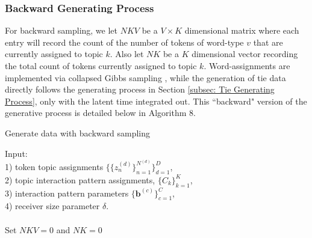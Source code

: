 \documentclass[a4paper]{article}
\begin{document}
            \subsubsection{Backward Generating Process} \label{subsubsec: Backward Generative Process}
        For backward sampling, we let $NKV$ be a $V\times K$ dimensional matrix where each entry will record the count of the number of tokens of word-type $v$ that are currently assigned to topic $k$. Also let $NK$ be a $K$ dimensional vector recording the total count of tokens currently assigned to topic $k$. Word-assignments are implemented via collapsed Gibbs sampling \citep{griffiths2002gibbs}, while the generation of tie data directly follows the generating process in Section \ref{subsec: Tie Generating Process}, only with the latent time integrated out. This ``backward" version of the generative process is detailed below in Algorithm 8.
        \begin{algorithm}[H]
        	\SetAlgoLined
        	\caption{Generate data with backward sampling}
        	Input:\\
        	1) token topic assignments $\{\{z_n^{(d)}\}_{n=1}^{N^{(d)}}\}_{d=1}^D$,\\
        	2) topic interaction pattern assignments, $\{C_k\}_{k=1}^K$,\\
        	3) interaction pattern parameters $\{\boldsymbol{b}^{(c)}\}_{c=1}^C$, \\
        	4) receiver size parameter $\delta$.\\\\
        		Set $NKV = 0$ and $NK = 0$\\
        \end{algorithm}
        \newpage
\end{document}
